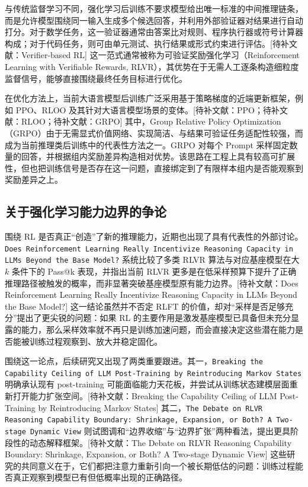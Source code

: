 与传统监督学习不同，强化学习后训练不要求模型给出唯一标准的中间推理链条，而是允许模型围绕同一输入生成多个候选回答，并利用外部验证器对结果进行自动打分。对于数学任务，这一验证器通常由答案比对规则、程序执行器或符号计算器构成；对于代码任务，则可由单元测试、执行结果或形式约束进行评估。[待补文献：Verifier-based RL] 这一范式通常被称为可验证奖励强化学习（Reinforcement Learning with Verifiable Rewards, RLVR），其优势在于无需人工逐条构造细粒度监督信号，能够直接围绕最终任务目标进行优化。

在优化方法上，当前大语言模型后训练广泛采用基于策略梯度的近端更新框架，例如 PPO、RLOO 及其针对大语言模型场景的变体。[待补文献：PPO；待补文献：RLOO；待补文献：GRPO] 其中，Group Relative Policy Optimization（GRPO）由于无需显式价值网络、实现简洁、与结果可验证任务适配性较强，而成为当前推理类后训练中的代表性方法之一。GRPO 对每个 Prompt 采样固定数量的回答，并根据组内奖励差异构造相对优势。该思路在工程上具有较高可扩展性，但也把训练信号是否存在这一问题，直接绑定到了有限样本组内是否能观察到奖励差异之上。

\subsection{关于强化学习能力边界的争论}

围绕 RL 是否真正“创造”了新的推理能力，近期也出现了具有代表性的外部讨论。\texttt{Does Reinforcement Learning Really Incentivize Reasoning Capacity in LLMs Beyond the Base Model?} 系统比较了多类 RLVR 算法与对应基座模型在大 \(k\) 条件下的 Pass@k 表现，并指出当前 RLVR 更多是在低采样预算下提升了正确推理路径被触发的概率，而非显著突破基座模型原有能力边界。[待补文献：Does Reinforcement Learning Really Incentivize Reasoning Capacity in LLMs Beyond the Base Model?] 这一结论虽然并不否定 RLFT 的价值，却对“采样是否足够充分”提出了更尖锐的问题：如果 RL 的主要作用是激发基座模型已具备但未充分显露的能力，那么采样效率就不再只是训练加速问题，而会直接决定这些潜在能力是否能被训练过程观察到、放大并稳定固化。

围绕这一论点，后续研究又出现了两类重要跟进。其一，\texttt{Breaking the Capability Ceiling of LLM Post-Training by Reintroducing Markov States} 明确承认现有 post-training 可能面临能力天花板，并尝试从训练状态建模层面重新打开能力扩张空间。[待补文献：Breaking the Capability Ceiling of LLM Post-Training by Reintroducing Markov States] 其二，\texttt{The Debate on RLVR Reasoning Capability Boundary: Shrinkage, Expansion, or Both? A Two-stage Dynamic View} 则试图调和“边界收缩”与“边界扩张”两种看法，提出更具阶段性的动态解释框架。[待补文献：The Debate on RLVR Reasoning Capability Boundary: Shrinkage, Expansion, or Both? A Two-stage Dynamic View] 这些研究的共同意义在于，它们都把注意力重新引向一个被长期低估的问题：训练过程能否真正观察到模型已有但低概率出现的正确路径。

